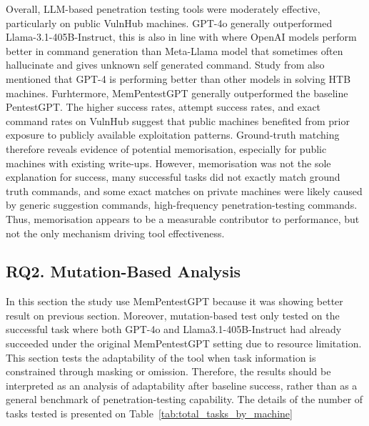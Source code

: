 \documentclass[acmtog]{acmart}
\begin{document}
Overall, LLM-based penetration testing tools were moderately effective, particularly on public VulnHub machines. GPT-4o generally outperformed Llama-3.1-405B-Instruct, this is also in line with \citet{happe_llms_2026} where OpenAI models perform better in command generation than Meta-Llama model that sometimes often hallucinate and gives unknown self generated command. Study from \citet{nakano_guided_2025} also mentioned that GPT-4 is performing better than other models in solving HTB machines. Furhtermore, MemPentestGPT generally outperformed the baseline PentestGPT. The higher success rates, attempt success rates, and exact command rates on VulnHub suggest that public machines benefited from prior exposure to publicly available exploitation patterns. Ground-truth matching therefore reveals evidence of potential memorisation, especially for public machines with existing write-ups. However, memorisation was not the sole explanation for success, many successful tasks did not exactly match ground truth commands, and some exact matches on private machines were likely caused by generic suggestion commands, high-frequency penetration-testing commands. Thus, memorisation appears to be a measurable contributor to performance, but not the only mechanism driving tool effectiveness.


\subsection{RQ2. Mutation-Based Analysis}
In this section the study use MemPentestGPT because it was showing better result on previous section. Moreover, mutation-based test only tested on the successful task where both GPT-4o and Llama3.1-405B-Instruct had already succeeded under the original MemPentestGPT setting due to resource limitation. This section tests the adaptability of the tool when task information is constrained through masking or omission. Therefore, the results should be interpreted as an analysis of adaptability after baseline success, rather than as a general benchmark of penetration-testing capability. The details of the number of tasks tested is presented on Table~\ref{tab:total_tasks_by_machine}
\end{document}
